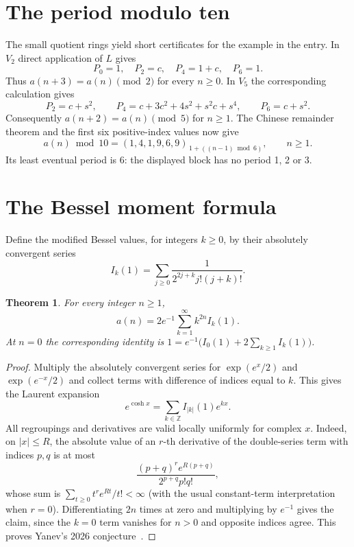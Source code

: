 \documentclass[10pt]{article}
\newtheorem{theorem}{Theorem}
\begin{document}
\section{The period modulo ten}
The small quotient rings yield short certificates for the example in the entry.
In $V_2$ direct application of $L$ gives
\[
 P_0=1,\quad P_2=c,\quad P_4=1+c,\quad P_6=1.
\]
Thus $a(n+3)=a(n)\pmod2$ for every $n\ge0$.
In $V_5$ the corresponding calculation gives
\[
 P_2=c+s^2,\qquad
 P_4=c+3c^2+4s^2+s^2c+s^4,\qquad P_6=c+s^2.
\]
Consequently $a(n+2)=a(n)\pmod5$ for $n\ge1$. The Chinese remainder
theorem and the first six positive-index values now give
\[
 a(n)\bmod10=(1,4,1,9,6,9)_{\,1+((n-1)\bmod6)},\qquad n\ge1.
\]
Its least eventual period is 6: the displayed block has no period 1, 2 or 3.

\section{The Bessel moment formula}
Define the modified Bessel values, for integers $k\ge0$, by their absolutely
convergent series
\[
 I_k(1)=\sum_{j\ge0}\frac{1}{2^{2j+k}j!(j+k)!}.
\]
\begin{theorem}
For every integer $n\ge1$,
\[
 a(n)=2e^{-1}\sum_{k=1}^{\infty} k^{2n}I_k(1).
\]
At $n=0$ the corresponding identity is
$1=e^{-1}\bigl(I_0(1)+2\sum_{k\ge1}I_k(1)\bigr)$.
\end{theorem}
\begin{proof}
Multiply the absolutely convergent series for $\exp(e^x/2)$ and
$\exp(e^{-x}/2)$ and collect terms with difference of indices equal to $k$.
This gives the Laurent expansion
\[
 e^{\cosh x}=\sum_{k\in\mathbb Z} I_{|k|}(1)e^{kx}.
\]
All regroupings and derivatives are valid locally uniformly for complex $x$.
Indeed, on $|x|\le R$, the absolute value of an $r$-th derivative of the
double-series term with indices $p,q$ is at most
\[
 \frac{(p+q)^r e^{R(p+q)}}{2^{p+q}p!q!},
\]
whose sum is $\sum_{t\ge0}t^r e^{Rt}/t!<\infty$
(with the usual constant-term interpretation when $r=0$).
Differentiating $2n$ times at zero and multiplying by $e^{-1}$ gives the
claim, since the $k=0$ term vanishes for $n>0$ and opposite indices agree.
This proves Yanev's 2026 conjecture~\cite{oeis}.
\end{proof}
\end{document}
